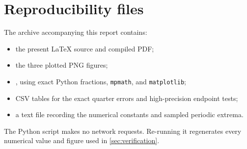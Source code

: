 \documentclass[11pt,oneside]{article}
\numberwithin{equation}{section}
\theoremstyle{definition}
\theoremstyle{remark}
\begin{document}
\section{Reproducibility files}
\label{app:reproducibility}

The archive accompanying this report contains:
\begin{itemize}
 \item the present LaTeX source and compiled PDF;
 \item the three plotted PNG figures;
 \item {}, using exact Python fractions, \texttt{mpmath}, and
 \texttt{matplotlib};
 \item CSV tables for the exact quarter errors and high-precision endpoint tests;
 \item a text file recording the numerical constants and sampled periodic extrema.
\end{itemize}
The Python script makes no network requests.  Re-running it regenerates every numerical
value and figure used in \cref{sec:verification}.
\end{document}
